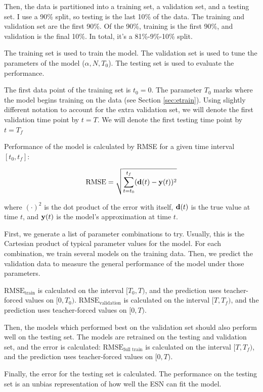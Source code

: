 \documentclass{article}
\begin{document}
Then, the data is partitioned into a training set, a validation set, and a
testing set. I use a 90\% split, so testing is the last 10\% of the data. The
training and validation set are the first 90\%. Of the 90\%, training is the
first 90\%, and validation is the final 10\%. In total, it's a 81\%-9\%-10\%
split.

The training set is used to train the model. The validation set is used to
tune the parameters of the model ($\alpha, N, T_0$). The testing set is used
to evaluate the performance.

The first data point of the training set is $t_0 = 0$. The parameter $T_0$
marks where the model begins training on the data (see Section
\ref{sec:etrain}). Using slightly different notation to account for the extra
validation set, we will denote the first validation time point by $t = T$. We
will denote the first testing time point by $t = T_f$

Performance of the model is calculated by RMSE for a given time interval
$[t_0, t_f]$:

\begin{align}
    \text{RMSE} = \sqrt{\sum^{t_f}_{t=t_0} (\mathbf{d}(t) - \mathbf{y}(t))^2}
\end{align}

where $(\cdot)^2$ is the dot product of the error with itself, $\mathbf{d}(t)$ is
the true value at time $t$, and $\mathbf{y}(t)$ is the model's approximation at time
$t$.

First, we generate a list of parameter combinations to try. Usually, this is
the Cartesian product of typical parameter values for the model. For each
combination, we train several models on the training data. Then, we predict
the validation data to measure the general performance of the model under
those parameters.

$\text{RMSE}_\text{train}$ is calculated on the interval $[T_0, T)$, and the
prediction uses teacher-forced values on $[0, T_0)$.
$\text{RMSE}_\text{validation}$ is calculated on the interval $[T, T_f)$, and
the prediction uses teacher-forced values on $[0, T)$.

Then, the models which performed best on the validation set should also
perform well on the testing set. The models are retrained on the testing and
validation set, and the error is calculated: $\text{RMSE}_\text{full train}$
is calculated on the interval $[T, T_f)$, and the prediction uses
teacher-forced values on $[0, T)$.

Finally, the error for the testing set is calculated. The performance on the
testing set is an unbias representation of how well the ESN can fit the
model.
\end{document}

